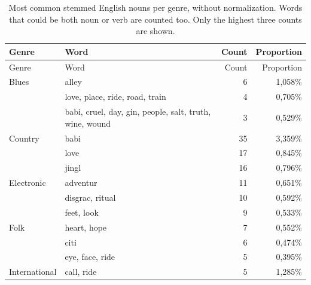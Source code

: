 \documentclass[                                                             %
        12pt,                                                                   %
        twoside                                                                 %
    ]{scrartcl}                                                                 %
\begin{document}
{\footnotesize
\begin{longtabu} to \linewidth {l X r r}
    \caption[Most common stemmed English nouns per genre, without normalization.]{%
        Most common stemmed English nouns per genre, without normalization.
        Words that could be both noun or verb are counted too.
        Only the highest three counts are shown.
    }
    \label{tab:most-common-nouns-by-genre} \\ \toprule
    Genre & Word & Count & Proportion \\ \midrule
    \endfirsthead
    \toprule
    Genre & Word & Count & Proportion \\ \midrule
    \endhead
    \bottomrule
    \endfoot
	Blues         & alley                                                            & 6      & 1,058\% \\*
	              & love, place, ride, road, train                                   & 4      & 0,705\% \\*
	              & babi, cruel, day, gin, people, salt, truth, wine, wound          & 3      & 0,529\% \\
	Country       & babi                                                             & 35     & 3,359\% \\*
	              & love                                                             & 17     & 0,845\% \\*
	              & jingl                                                            & 16     & 0,796\% \\
	Electronic    & adventur                                                         & 11     & 0,651\% \\*
	              & disgrac, ritual                                                  & 10     & 0,592\% \\*
	              & feet, look                                                       & 9      & 0,533\% \\
	Folk          & heart, hope                                                      & 7      & 0,552\% \\*
	              & citi                                                             & 6      & 0,474\% \\*
	              & eye, face, ride                                                  & 5      & 0,395\% \\
	International & call, ride                                                       & 5      & 1,285\% \\*

\end{longtabu}}
\end{document}
